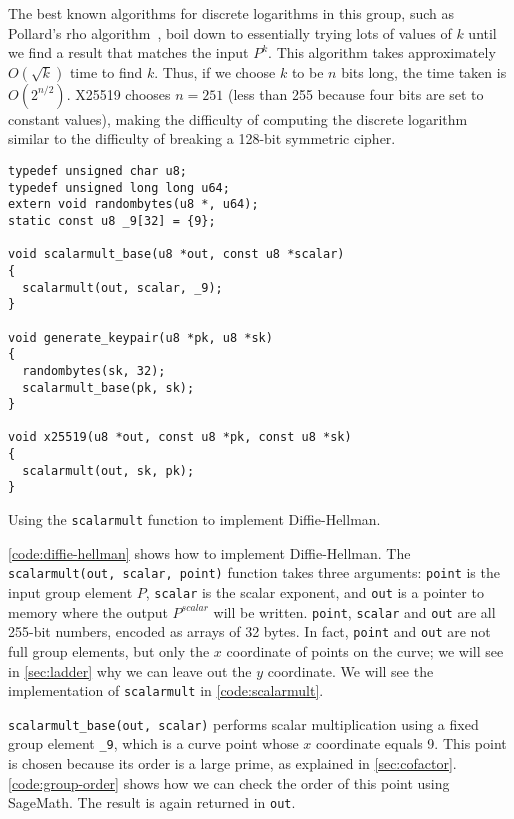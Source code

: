 \documentclass[manuscript]{acmart}
\begin{document}
The best known algorithms for discrete logarithms in this group, such as Pollard's rho algorithm~\cite{Pollard:1978do}, boil down to essentially trying lots of values of $k$ until we find a result that matches the input $P^k$.
This algorithm takes approximately $O(\sqrt{k})$ time to find $k$.
Thus, if we choose $k$ to be $n$ bits long, the time taken is $O(2^{n/2})$.
X25519 chooses $n=251$ (less than 255 because four bits are set to constant values), making the difficulty of computing the discrete logarithm similar to the difficulty of breaking a 128-bit symmetric cipher.

\begin{listing}
\begin{verbatim}
typedef unsigned char u8;
typedef unsigned long long u64;
extern void randombytes(u8 *, u64);
static const u8 _9[32] = {9};

void scalarmult_base(u8 *out, const u8 *scalar)
{ 
  scalarmult(out, scalar, _9);
}

void generate_keypair(u8 *pk, u8 *sk)
{
  randombytes(sk, 32);
  scalarmult_base(pk, sk);
}

void x25519(u8 *out, const u8 *pk, const u8 *sk)
{
  scalarmult(out, sk, pk);
}
\end{verbatim}
\caption{Using the \texttt{scalarmult} function to implement Diffie-Hellman.}\label{code:diffie-hellman}
\end{listing}

\autoref{code:diffie-hellman} shows how to implement Diffie-Hellman.
The \verb|scalarmult(out, scalar, point)| function takes three arguments: \verb|point| is the input group element $P$, \verb|scalar| is the scalar exponent, and \verb|out| is a pointer to memory where the output $P^\mathit{scalar}$ will be written.
\verb|point|, \verb|scalar| and \verb|out| are all 255-bit numbers, encoded as arrays of 32 bytes.
In fact, \verb|point| and \verb|out| are not full group elements, but only the $x$ coordinate of points on the curve; we will see in \autoref{sec:ladder} why we can leave out the $y$ coordinate.
We will see the implementation of \verb|scalarmult| in \autoref{code:scalarmult}.

\verb|scalarmult_base(out, scalar)| performs scalar multiplication using a fixed group element \verb|_9|, which is a curve point whose $x$ coordinate equals 9.
This point is chosen because its order is a large prime, as explained in \autoref{sec:cofactor}.
\autoref{code:group-order} shows how we can check the order of this point using SageMath.
The result is again returned in \verb|out|.
\end{document}
